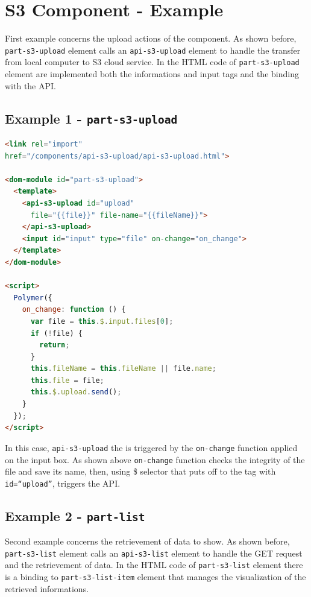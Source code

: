 \section{S3 Component - Example}
\label{sec:S3_exmpl}

First example concerns the upload actions of the component.
As shown before, \texttt{part-s3-upload} element calls an \texttt{api-s3-upload} element to handle the transfer from local computer to S3 cloud service.
In the HTML code of \texttt{part-s3-upload} element are implemented both the informations and input tags and the binding with the API.

\subsection{Example 1 - \texttt{part-s3-upload}}

\begin{lstlisting}[language=html]
<link rel="import"
href="/components/api-s3-upload/api-s3-upload.html">

<dom-module id="part-s3-upload">
  <template>
    <api-s3-upload id="upload"
      file="{{file}}" file-name="{{fileName}}">
    </api-s3-upload>
    <input id="input" type="file" on-change="on_change">
  </template>
</dom-module>

<script>
  Polymer({
    on_change: function () {
      var file = this.$.input.files[0];
      if (!file) {
        return;
      }
      this.fileName = this.fileName || file.name;
      this.file = file;
      this.$.upload.send();
    }
  });
</script>

\end{lstlisting}

In this case, \texttt{api-s3-upload} the is triggered by the \texttt{on-change} function applied on the input box. As shown above \texttt{on-change} function checks the integrity of the file and save its name, then, using \$ selector that puts off to the tag with \texttt{id=``upload''}, triggers the API.

\subsection{Example 2 - \texttt{part-list}}

Second example concerns the retrievement of data to show.
As shown before, \texttt{part-s3-list} element calls an \texttt{api-s3-list} element to handle the GET request and the retrievement of data.
In the HTML code of \texttt{part-s3-list} element there is a binding to \texttt{part-s3-list-item} element that manages the visualization of the retrieved informations.


